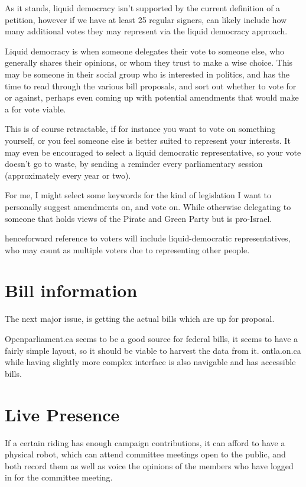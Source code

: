 \documentclass{report}
\begin{document}
As it stands, liquid democracy isn't supported by the current definition of a petition, however if we have at least 25 regular signers, can likely include how many additional votes they may represent via the liquid democracy approach.

Liquid democracy is when someone delegates their vote to someone else, who generally shares their opinions, or whom they trust to make a wise choice. This may be someone in their social group who is interested in politics, and has the time to read through the various bill proposals, and sort out whether to vote for or against, perhaps even coming up with potential amendments that would make a for vote viable.

This is of course retractable, if for instance you want to vote on something yourself, or you feel someone else is better suited to represent your interests.  It may even be encouraged to select a liquid democratic representative, so your vote doesn't go to waste, by sending a reminder every parliamentary session (approximately every year or two).

For me, I might select some keywords for the kind of legislation I want to personally suggest amendments on, and vote on. While otherwise delegating to someone that holds views of the Pirate and Green Party but is pro-Israel. 

henceforward reference to voters will include liquid-democratic representatives, who may count as multiple voters due to representing other people.

\section{Bill information}

The next major issue, is getting the actual bills which are up for proposal.

Openparliament.ca seems to be a good source for federal bills, it seems to have a fairly simple layout, so it should be viable to harvest the data from it. ontla.on.ca while having slightly more complex interface is also navigable and has accessible bills.

\section{Live Presence}

If a certain riding has enough campaign contributions, it can afford to have a physical robot, which can attend committee meetings open to the public, and both record them as well as voice the opinions of the members who have logged in for the committee meeting.
\end{document}
